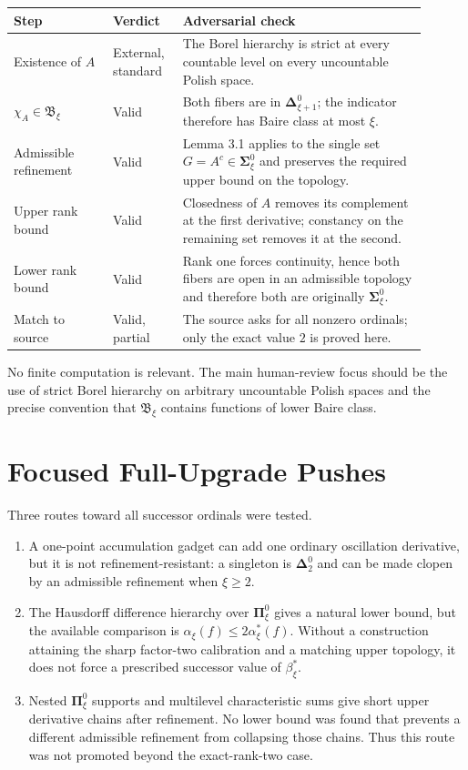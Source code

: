 \documentclass[11pt]{article}
\newcommand{\B}{\mathfrak{B}}
\newcommand{\borelSigma}{\boldsymbol{\Sigma}}
\newcommand{\borelPi}{\boldsymbol{\Pi}}
\newcommand{\borelDelta}{\boldsymbol{\Delta}}
\begin{document}
\begin{center}
\small
\begin{tabular}{>{\raggedright\arraybackslash}p{0.22\linewidth}
                >{\raggedright\arraybackslash}p{0.14\linewidth}
                >{\raggedright\arraybackslash}p{0.54\linewidth}}
\toprule
Step & Verdict & Adversarial check \\
\midrule
Existence of $A$ & External, standard & The Borel hierarchy is strict at every countable level on every uncountable Polish space. \\
$\chi_A\in\B_\xi$ & Valid & Both fibers are in $\borelDelta^0_{\xi+1}$; the indicator therefore has Baire class at most $\xi$. \\
Admissible refinement & Valid & Lemma 3.1 applies to the single set $G=A^c\in\borelSigma^0_\xi$ and preserves the required upper bound on the topology. \\
Upper rank bound & Valid & Closedness of $A$ removes its complement at the first derivative; constancy on the remaining set removes it at the second. \\
Lower rank bound & Valid & Rank one forces continuity, hence both fibers are open in an admissible topology and therefore both are originally $\borelSigma^0_\xi$. \\
Match to source & Valid, partial & The source asks for all nonzero ordinals; only the exact value $2$ is proved here. \\
\bottomrule
\end{tabular}
\end{center}

No finite computation is relevant.  The main human-review focus should be the
use of strict Borel hierarchy on arbitrary uncountable Polish spaces and the
precise convention that $\B_\xi$ contains functions of lower Baire class.

\section*{Focused Full-Upgrade Pushes}

Three routes toward all successor ordinals were tested.

\begin{enumerate}
\item A one-point accumulation gadget can add one ordinary oscillation
derivative, but it is not refinement-resistant: a singleton is
$\borelDelta^0_2$ and can be made clopen by an admissible refinement when
$\xi\geq2$.
\item The Hausdorff difference hierarchy over $\borelPi^0_\xi$ gives a
natural lower bound, but the available comparison is
$\alpha_\xi(f)\leq2\alpha^*_\xi(f)$.  Without a construction attaining the
sharp factor-two calibration and a matching upper topology, it does not
force a prescribed successor value of $\beta^*_\xi$.
\item Nested $\borelPi^0_\xi$ supports and multilevel characteristic sums
give short upper derivative chains after refinement.  No lower bound was
found that prevents a different admissible refinement from collapsing those
chains.  Thus this route was not promoted beyond the exact-rank-two case.
\end{enumerate}
\end{document}
